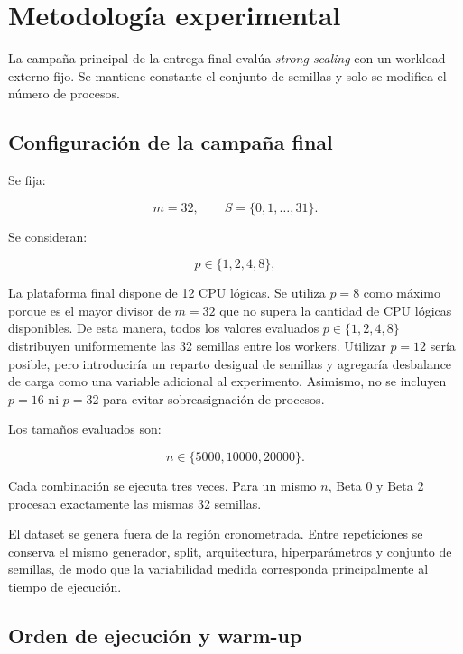 \documentclass[11pt,a4paper]{article}
\begin{document}
\section{Metodología experimental}

La campaña principal de la entrega final evalúa \emph{strong scaling} con un workload
externo fijo. Se mantiene constante el conjunto de semillas y solo se modifica
el número de procesos.

\subsection{Configuración de la campaña final}

Se fija:

\begin{equation}
    m=32,
    \qquad
    S=\{0,1,\ldots,31\}.
\end{equation}

Se consideran:

\begin{equation}
    p\in\{1,2,4,8\},
\end{equation}

La plataforma final dispone de 12 CPU lógicas. Se utiliza $p=8$ como máximo
porque es el mayor divisor de $m=32$ que no supera la cantidad de CPU lógicas
disponibles. De esta manera, todos los valores evaluados
$p\in\{1,2,4,8\}$ distribuyen uniformemente las 32 semillas entre los workers.
Utilizar $p=12$ sería posible, pero introduciría un reparto desigual de semillas
y agregaría desbalance de carga como una variable adicional al experimento.
Asimismo, no se incluyen $p=16$ ni $p=32$ para evitar sobreasignación de procesos.

Los tamaños evaluados son:

\begin{equation}
    n\in\{5000,10000,20000\}.
\end{equation}

Cada combinación se ejecuta tres veces. Para un mismo $n$, Beta 0 y Beta 2 procesan
exactamente las mismas 32 semillas.

El dataset se genera fuera de la región cronometrada. Entre repeticiones se conserva
el mismo generador, split, arquitectura, hiperparámetros y conjunto de semillas, de
modo que la variabilidad medida corresponda principalmente al tiempo de ejecución.

\subsection{Orden de ejecución y warm-up}
\end{document}
